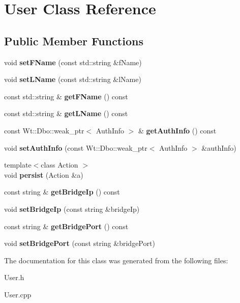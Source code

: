 \hypertarget{class_user}{}\section{User Class Reference}
\label{class_user}
\subsection*{Public Member Functions}
\begin{DoxyCompactItemize}
\item 
\mbox{\label{class_user_a8169cdbd61e0728531444d666bff1796}} 
void {\bfseries set\+F\+Name} (const std\+::string \&f\+Name)
\item 
\mbox{\label{class_user_aeab996acd54819bf0b193349ebe2abc1}} 
void {\bfseries set\+L\+Name} (const std\+::string \&l\+Name)
\item 
\mbox{\label{class_user_a54095a0a346bc98e20ddd8a5e9b9db20}} 
const std\+::string \& {\bfseries get\+F\+Name} () const
\item 
\mbox{\label{class_user_a05aebfe0cdbaef0fd0879b28acf36c47}} 
const std\+::string \& {\bfseries get\+L\+Name} () const
\item 
\mbox{\label{class_user_abe05604556a014f0588aa1f0bcbe3ea8}} 
const Wt\+::\+Dbo\+::weak\+\_\+ptr$<$ Auth\+Info $>$ \& {\bfseries get\+Auth\+Info} () const
\item 
\mbox{\label{class_user_af36fc7ba3c6d8100c0c1c6b383db669a}} 
void {\bfseries set\+Auth\+Info} (const Wt\+::\+Dbo\+::weak\+\_\+ptr$<$ Auth\+Info $>$ \&auth\+Info)
\item 
\mbox{\label{class_user_a626b516f8e54e0b98c4b20c488de01b8}} 
{\footnotesize template$<$class Action $>$ }\\void {\bfseries persist} (Action \&a)
\item 
\mbox{\label{class_user_a0a6fedbf62e9966d9aced7e74dc846ed}} 
const string \& {\bfseries get\+Bridge\+Ip} () const
\item 
\mbox{\label{class_user_ae80a586ed5c3df0731011bab08199624}} 
void {\bfseries set\+Bridge\+Ip} (const string \&bridge\+Ip)
\item 
\mbox{\label{class_user_aeb37fd95e4fe0a4514a3ac5f92f71c90}} 
const string \& {\bfseries get\+Bridge\+Port} () const
\item 
\mbox{\label{class_user_a1367679fc11638d1e767974e2316e88e}} 
void {\bfseries set\+Bridge\+Port} (const string \&bridge\+Port)
\end{DoxyCompactItemize}


The documentation for this class was generated from the following files\+:\begin{DoxyCompactItemize}
\item 
User.\+h\item 
User.\+cpp\end{DoxyCompactItemize}
